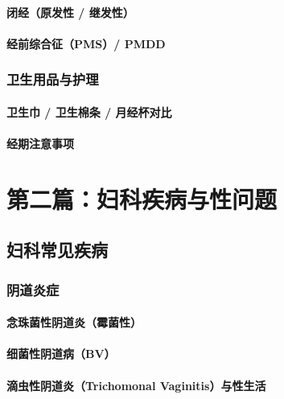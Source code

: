 \subsection{闭经（原发性 / 继发性）}
\subsection{经前综合征（PMS）/ PMDD}

\section{卫生用品与护理}
\subsection{卫生巾 / 卫生棉条 / 月经杯对比}
\subsection{经期注意事项}

\part{第二篇：妇科疾病与性问题}

\chapter{妇科常见疾病}

\section{阴道炎症}
\subsection{念珠菌性阴道炎（霉菌性）}
\subsection{细菌性阴道病（BV）}
\subsection{滴虫性阴道炎（Trichomonal Vaginitis）与性生活}

